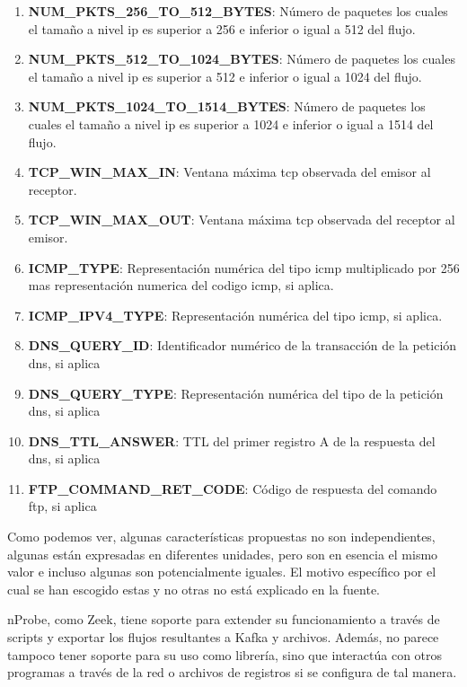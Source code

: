 \begin{enumerate}
    \item \textbf{NUM\_PKTS\_256\_TO\_512\_BYTES}: Número de paquetes los cuales el tamaño a nivel \acrshort{ip} es superior a 256 e inferior o igual a 512 del flujo.
    \item \textbf{NUM\_PKTS\_512\_TO\_1024\_BYTES}: Número de paquetes los cuales el tamaño a nivel \acrshort{ip} es superior a 512 e inferior o igual a 1024 del flujo.
    \item \textbf{NUM\_PKTS\_1024\_TO\_1514\_BYTES}: Número de paquetes los cuales el tamaño a nivel \acrshort{ip} es superior a 1024 e inferior o igual a 1514 del flujo.
    \item \textbf{TCP\_WIN\_MAX\_IN}: Ventana máxima \acrshort{tcp} observada del emisor al receptor.
    \item \textbf{TCP\_WIN\_MAX\_OUT}: Ventana máxima \acrshort{tcp} observada del receptor al emisor.
    \item \textbf{ICMP\_TYPE}: Representación numérica del tipo \acrshort{icmp} multiplicado por 256 mas representación numerica del codigo  \acrshort{icmp}, si aplica.
    \item \textbf{ICMP\_IPV4\_TYPE}: Representación numérica del tipo \acrshort{icmp}, si aplica.
    \item \textbf{DNS\_QUERY\_ID}: Identificador numérico de la transacción de la petición \acrshort{dns}, si aplica
    \item \textbf{DNS\_QUERY\_TYPE}: Representación numérica del tipo de la petición \acrshort{dns}, si aplica
    \item \textbf{DNS\_TTL\_ANSWER}: TTL del primer registro A de la respuesta del \acrshort{dns}, si aplica
    \item \textbf{FTP\_COMMAND\_RET\_CODE}: Código de respuesta del comando \acrshort{ftp}, si aplica
\end{enumerate}

Como podemos ver, algunas características propuestas no son independientes, algunas están expresadas en diferentes unidades, pero son en esencia el mismo valor e incluso algunas son potencialmente iguales. El motivo específico por el cual se han escogido estas y no otras no está explicado en la fuente.

nProbe, como Zeek, tiene soporte para extender su funcionamiento a través de scripts y exportar los flujos resultantes a Kafka y archivos. Además, no parece tampoco tener soporte para su uso como librería, sino que interactúa con otros programas a través de la red o archivos de registros si se configura de tal manera.
